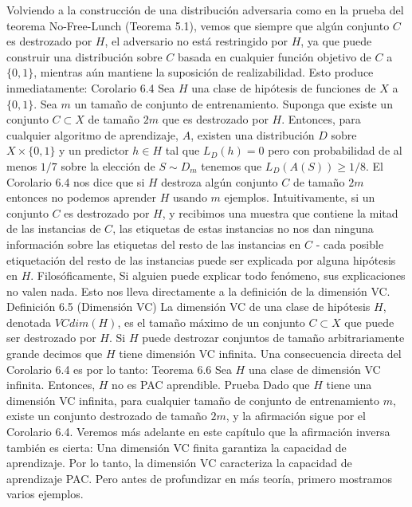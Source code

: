 Volviendo a la construcción de una distribución adversaria como en la prueba del teorema No-Free-Lunch (Teorema 5.1), vemos que siempre que algún conjunto $C$ es destrozado por $H$, el adversario no está restringido por $H$, ya que puede construir una distribución sobre $C$ basada en cualquier función objetivo de $C$ a $\{0, 1\}$, mientras aún mantiene la suposición de realizabilidad. Esto produce inmediatamente:
Corolario 6.4 Sea $H$ una clase de hipótesis de funciones de $X$ a $\{0, 1\}$. Sea $m$ un tamaño de conjunto de entrenamiento. Suponga que existe un conjunto $C \subset X$ de tamaño $2m$ que es destrozado por $H$. Entonces, para cualquier algoritmo de aprendizaje, $A$, existen una distribución $D$ sobre $X \times \{0, 1\}$ y un predictor $h \in H$ tal que $L_D(h) = 0$ pero con probabilidad de al menos $1/7$ sobre la elección de $S \sim D_m$ tenemos que $L_D(A(S)) \geq 1/8$.
El Corolario 6.4 nos dice que si $H$ destroza algún conjunto $C$ de tamaño $2m$ entonces no podemos aprender $H$ usando $m$ ejemplos. Intuitivamente, si un conjunto $C$ es destrozado por $H$, y recibimos una muestra que contiene la mitad de las instancias de $C$, las etiquetas de estas instancias no nos dan ninguna información sobre las etiquetas del resto de las instancias en $C$ - cada posible etiquetación del resto de las instancias puede ser explicada por alguna hipótesis en $H$. Filosóficamente,
Si alguien puede explicar todo fenómeno, sus explicaciones no valen nada.
Esto nos lleva directamente a la definición de la dimensión VC.
Definición 6.5 (Dimensión VC) La dimensión VC de una clase de hipótesis $H$, denotada $VCdim(H)$, es el tamaño máximo de un conjunto $C \subset X$ que puede ser destrozado por $H$. Si $H$ puede destrozar conjuntos de tamaño arbitrariamente grande decimos que $H$ tiene dimensión VC infinita.
Una consecuencia directa del Corolario 6.4 es por lo tanto:
Teorema 6.6 Sea $H$ una clase de dimensión VC infinita. Entonces, $H$ no es PAC aprendible.
Prueba Dado que $H$ tiene una dimensión VC infinita, para cualquier tamaño de conjunto de entrenamiento $m$, existe un conjunto destrozado de tamaño $2m$, y la afirmación sigue por el Corolario 6.4.
Veremos más adelante en este capítulo que la afirmación inversa también es cierta: Una dimensión VC finita garantiza la capacidad de aprendizaje. Por lo tanto, la dimensión VC caracteriza la capacidad de aprendizaje PAC. Pero antes de profundizar en más teoría, primero mostramos varios ejemplos.

